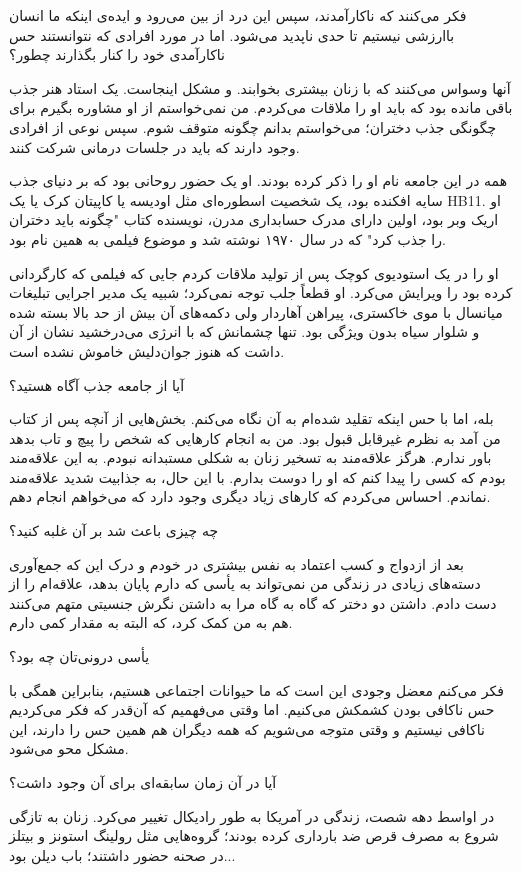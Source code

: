 فکر می‌کنند که ناکارآمدند، سپس این درد از بین می‌رود و ایده‌ی اینکه ما انسان باارزشی نیستیم تا حدی ناپدید می‌شود. اما در مورد افرادی که نتوانستند حس ناکارآمدی خود را کنار بگذارند چطور؟

آنها وسواس می‌کنند که با زنان بیشتری بخوابند. و مشکل اینجاست. یک استاد هنر جذب باقی مانده بود که باید او را ملاقات می‌کردم. من نمی‌خواستم از او مشاوره بگیرم برای چگونگی جذب دختران؛ می‌خواستم بدانم چگونه متوقف شوم. سپس نوعی از افرادی وجود دارند که باید در جلسات درمانی شرکت کنند.

همه در این جامعه نام او را ذکر کرده بودند. او یک حضور روحانی بود که بر دنیای جذب سایه افکنده بود، یک شخصیت اسطوره‌ای مثل اودیسه یا کاپیتان کرک یا یک HB11. او اریک وبر بود، اولین دارای مدرک حسابداری مدرن، نویسنده کتاب "چگونه باید دختران را جذب کرد" که در سال ۱۹۷۰ نوشته شد و موضوع فیلمی به همین نام بود.

او را در یک استودیوی کوچک پس از تولید ملاقات کردم جایی که فیلمی که کارگردانی کرده بود را ویرایش می‌کرد. او قطعاً جلب توجه نمی‌کرد؛ شبیه یک مدیر اجرایی تبلیغات میانسال با موی خاکستری، پیراهن آهاردار ولی دکمه‌های آن بیش از حد بالا بسته شده و شلوار سیاه بدون ویژگی بود. تنها چشمانش که با انرژی می‌درخشید نشان از آن داشت که هنوز جوان‌دلیش خاموش نشده است.

آیا از جامعه جذب آگاه هستید؟

بله، اما با حس اینکه تقلید شده‌ام به آن نگاه می‌کنم. بخش‌هایی از آنچه پس از کتاب من آمد به نظرم غیرقابل قبول بود. من به انجام کارهایی که شخص را پیچ و تاب بدهد باور ندارم. هرگز علاقه‌مند به تسخیر زنان به شکلی مستبدانه نبودم. به این علاقه‌مند بودم که کسی را پیدا کنم که او را دوست بدارم. با این حال، به جذابیت شدید علاقه‌مند نماندم. احساس می‌کردم که کارهای زیاد دیگری وجود دارد که می‌خواهم انجام دهم.

چه چیزی باعث شد بر آن غلبه کنید؟

بعد از ازدواج و کسب اعتماد به نفس بیشتری در خودم و درک این که جمع‌آوری دسته‌های زیادی در زندگی من نمی‌تواند به یأسی که دارم پایان بدهد، علاقه‌ام را از دست دادم. داشتن دو دختر که گاه به گاه مرا به داشتن نگرش جنسیتی متهم می‌کنند هم به من کمک کرد، که البته به مقدار کمی دارم.

یأسی درونی‌تان چه بود؟

فکر می‌کنم معضل وجودی این است که ما حیوانات اجتماعی هستیم، بنابراین همگی با حس ناکافی بودن کشمکش می‌کنیم. اما وقتی می‌فهمیم که آن‌قدر که فکر می‌کردیم ناکافی نیستیم و وقتی متوجه می‌شویم که همه دیگران هم همین حس را دارند، این مشکل محو می‌شود. 

آیا در آن زمان سابقه‌ای برای آن وجود داشت؟

در اواسط دهه شصت، زندگی در آمریکا به طور رادیکال تغییر می‌کرد. زنان به تازگی شروع به مصرف قرص ضد بارداری کرده بودند؛ گروه‌هایی مثل رولینگ استونز و بیتلز در صحنه حضور داشتند؛ باب دیلن بود...